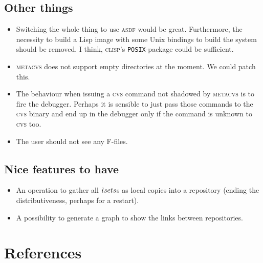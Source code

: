 \documentclass[fleqn, 10pt, a4paper]{article}
\begin{document}
\subsection{Other things}
\begin{itemize}
\item Switching the whole thing to use \textsc{asdf} would be great.
Furthermore, the necessity to build a Lisp image with some Unix bindings
to build the system should be removed. I think, \textsc{clisp}'s
\texttt{POSIX}-package could be sufficient.
\item \textsc{metacvs} does not support empty directories at the moment.
We could patch this.
\item The behaviour when issuing a \textsc{cvs} command not shadowed by
\textsc{metacvs} is to fire the debugger. Perhaps it is sensible to
just pass those commands to the \textsc{cvs} binary and end up in the debugger
only if the command is unknown to \textsc{cvs} too.
\item The user should not see any F-files.
\end{itemize}

\subsection{Nice features to have}

\begin{itemize}
\item An operation to gather all $\mathnormal{lsets}$s as
local copies into a repository (ending the distributiveness, perhaps
for a restart).
\item A possibility to generate a graph to show the links between
repositories.
\end{itemize}

\section{References}
\end{document}
